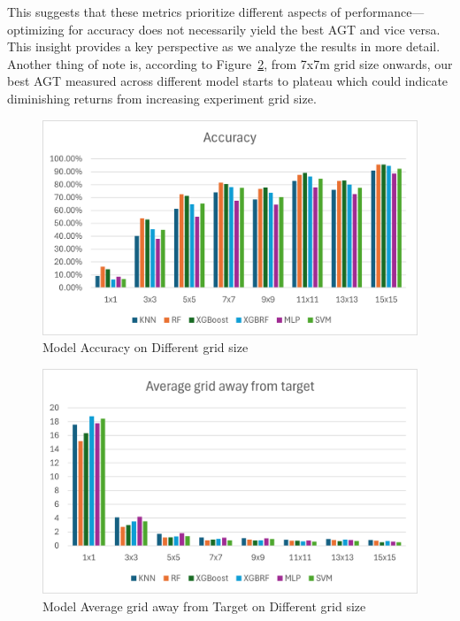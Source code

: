 \documentclass[conference]{IEEEtran}
\begin{document}
	
	
	This suggests that these metrics prioritize different aspects of performance—optimizing for accuracy does not necessarily yield the best AGT and vice versa. This insight provides a key perspective as we analyze the results in more detail. Another thing of note is, according to Figure~\ref{fig:AGT_dgrid_size}, from 7x7m grid size onwards, our best AGT measured across different model starts to plateau which could indicate diminishing returns from increasing experiment grid size.
	
	\begin{figure}[htbp]
		\centerline{\includegraphics[scale=0.65]{image3.png}}
		\caption{Model Accuracy on Different grid size}
		\label{fig:acc_dgird_size}
	\end{figure}
	
	\begin{figure}[htbp]
		\centerline{\includegraphics[scale=0.65]{image1.png}}
		\caption{Model Average grid away from Target on Different grid size}
		\label{fig:AGT_dgrid_size}
	\end{figure}
	
\end{document}
